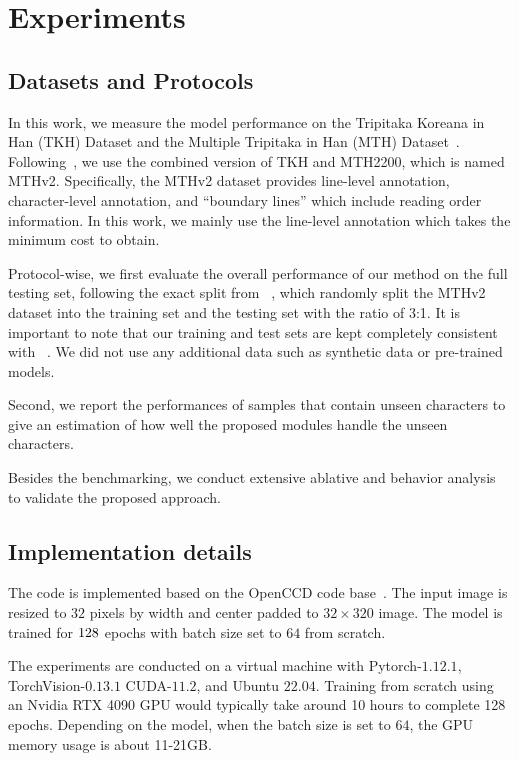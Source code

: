 \section{Experiments}

\subsection{Datasets and Protocols}
In this work, we measure the model performance on the Tripitaka Koreana in Han (TKH) Dataset and the Multiple Tripitaka in Han (MTH) Dataset~\cite{tkhmth}. Following~\cite{jla},
we use the combined version of TKH and MTH2200, which is named MTHv2. Specifically, the MTHv2 dataset provides line-level annotation, character-level annotation, and ``boundary lines'' which include reading order information. In this work, we mainly use the line-level annotation which takes the minimum cost to obtain. 

Protocol-wise, we first evaluate the overall performance of our method on the full testing set, following the exact split from ~\cite{jla}, which randomly split the MTHv2 dataset into the training set and the testing set with the ratio of 3:1. It is important to note that our training and test sets are kept completely consistent with ~\cite{jla}. We did not use any additional data such as synthetic data or pre-trained models.

Second, we report the performances of samples that contain unseen characters to give an estimation of how well the proposed modules handle the unseen characters.

Besides the benchmarking, we conduct extensive ablative and behavior analysis to validate the proposed approach.


\subsection{Implementation details}
The code is implemented based on the OpenCCD code base~\cite{vsdf}. The input image is resized to $32$ pixels by width and center padded to $32\times 320$ image. The model is trained for $128$ epochs with batch size set to $64$ from scratch. %

The experiments are conducted on a virtual machine with Pytorch-$1.12.1$, TorchVision-$0.13.1$ CUDA-$11.2$, and Ubuntu $22.04$. Training from scratch using an Nvidia RTX 4090 GPU would typically take around 10 hours to complete 128 epochs. Depending on the model, when the batch size is set to $64$, the GPU memory usage is about 11-21GB.

